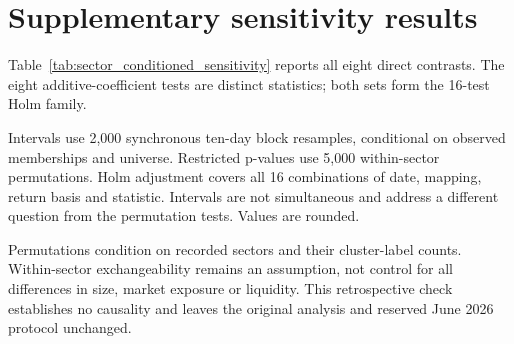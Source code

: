 \appendix
\section{Supplementary sensitivity results}\label{sec:supplementary_sensitivity}

Table~\ref{tab:sector_conditioned_sensitivity} reports all eight direct contrasts. The eight additive-coefficient tests are distinct statistics; both sets form the 16-test Holm family.

\setcounter{table}{0}
\renewcommand{\thetable}{S\arabic{table}}
\renewcommand{\theHtable}{supplement.\arabic{table}}
\begin{table}[htbp]
\centering
\caption{Direct within-sector contrasts for the two completed windows. $D_{\mathrm{within}}$ subtracts mean return correlation of same-sector/different-cluster pairs from that of same-sector/same-cluster pairs. Positive values favour shared clusters. This differs from the primary cluster-minus-sector $\Delta\rho$.}\label{tab:sector_conditioned_sensitivity}
\footnotesize
\setlength{\tabcolsep}{4pt}


\smallskip
\begin{minipage}{\linewidth}
\footnotesize
Intervals use 2,000 synchronous ten-day block resamples, conditional on observed memberships and universe. Restricted p-values use 5,000 within-sector permutations. Holm adjustment covers all 16 combinations of date, mapping, return basis and statistic. Intervals are not simultaneous and address a different question from the permutation tests. Values are rounded.
\end{minipage}
\end{table}

Permutations condition on recorded sectors and their cluster-label counts. Within-sector exchangeability remains an assumption, not control for all differences in size, market exposure or liquidity. This retrospective check establishes no causality and leaves the original analysis and reserved June 2026 protocol unchanged.
\FloatBarrier
